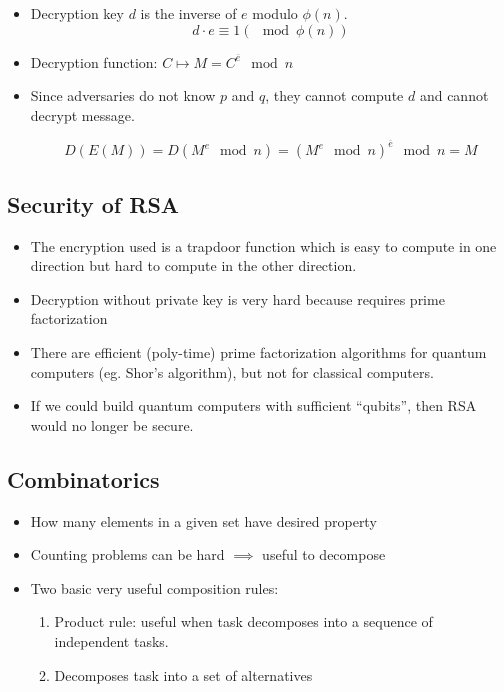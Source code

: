 \documentclass{scrreprt}
\begin{document}
\begin{itemize}
    \item Decryption key $d$ is the inverse of $e$ modulo $\phi(n)$.
          \[d\cdot e\equiv 1 (\mod \phi(n))\]

    \item Decryption function: $C \mapsto M = C^{\overline{e}} \mod n$
    \item Since adversaries do not know $p$ and $q$, they cannot compute $d$ and cannot decrypt message.

          \[
              D(E(M)) = D(M^e\mod n) = (M^e\mod n)^{\overline{e}}\mod n = M
          \]
\end{itemize}

\subsection{Security of RSA}

\begin{itemize}
    \item The encryption used is a trapdoor function which is easy to compute
          in one direction but hard to compute in the other direction.
    \item Decryption without private key is very hard because requires prime factorization
    \item There are efficient (poly-time) prime factorization algorithms for
          quantum computers (eg. Shor's algorithm), but not for classical computers.
    \item If we could build quantum computers with sufficient ``qubits'', then
          RSA would no longer be secure.
\end{itemize}

\subsection{Combinatorics}

\begin{itemize}
    \item How many elements in a given set have desired property
    \item Counting problems can be hard $\implies$ useful to decompose
    \item Two basic very useful composition rules:
          \begin{enumerate}
              \item Product rule: useful when task decomposes into a sequence of independent tasks.
              \item Decomposes task into a set of alternatives
          \end{enumerate}
\end{itemize}
\end{document}
